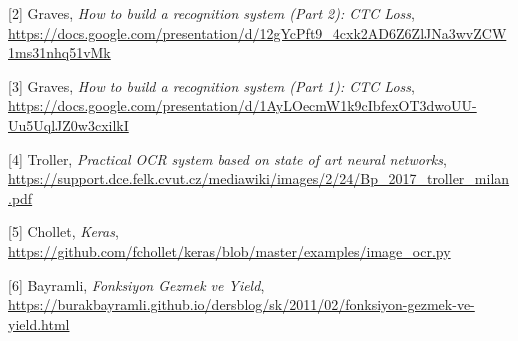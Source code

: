\documentclass[12pt,fleqn]{article}\usepackage{../../common}
\begin{document}
[2] Graves, {\em How to build a recognition system (Part 2): CTC Loss}, 
    \url{https://docs.google.com/presentation/d/12gYcPft9_4cxk2AD6Z6ZlJNa3wvZCW1ms31nhq51vMk}

[3] Graves, {\em How to build a recognition system (Part 1): CTC Loss}, 
    \url{https://docs.google.com/presentation/d/1AyLOecmW1k9cIbfexOT3dwoUU-Uu5UqlJZ0w3cxilkI}

[4] Troller, {\em Practical OCR system based on state of art neural networks}, 
    \url{https://support.dce.felk.cvut.cz/mediawiki/images/2/24/Bp_2017_troller_milan.pdf}

[5] Chollet, {\em Keras}, 
    \url{https://github.com/fchollet/keras/blob/master/examples/image_ocr.py}

[6] Bayramli, {\em Fonksiyon Gezmek ve Yield}, 
    \url{https://burakbayramli.github.io/dersblog/sk/2011/02/fonksiyon-gezmek-ve-yield.html}
\end{document}
